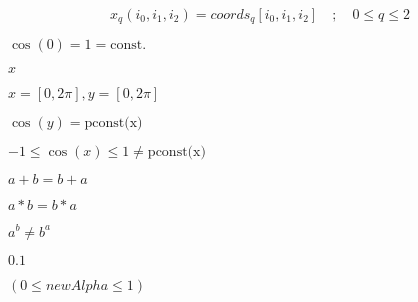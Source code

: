 \documentclass{article}
\begin{document}
\[ x_{q}(i_0, i_1, i_2) = coords_{q}[i_0, i_1, i_2] \quad ; \quad 0 \leq q \leq 2 \]
\pagebreak

$\cos(0) = 1 = \text{const.}$
\pagebreak

$x$
\pagebreak

$x=[0,2\pi], y=[0,2\pi]$
\pagebreak

$\cos(y) = \text{pconst(x)}$
\pagebreak

$-1 \leq \cos(x) \leq 1 \neq \text{pconst(x)}$
\pagebreak

$a+b = b+a$
\pagebreak

$a*b = b*a$
\pagebreak

$a^b \neq b^a$
\pagebreak

$0.1$
\pagebreak

$(0 \le newAlpha \le 1)$
\pagebreak
\end{document}
